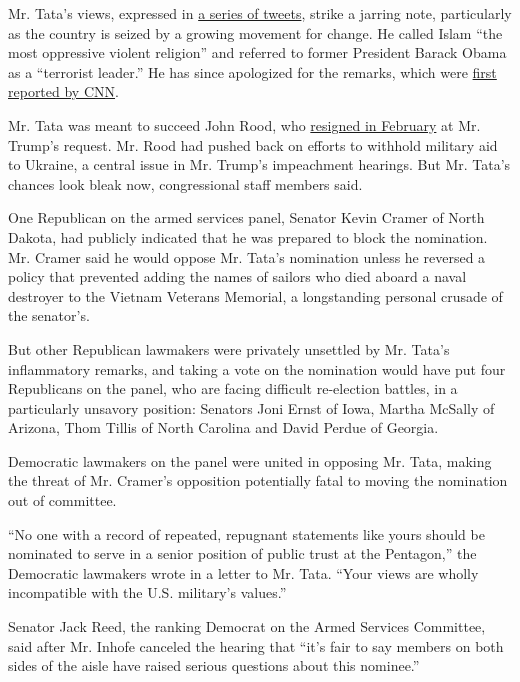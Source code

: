 Mr. Tata's views, expressed in
\href{https://twitter.com/ajtata/status/1014278134185840640}{a series of
tweets}, strike a jarring note, particularly as the country is seized by
a growing movement for change. He called Islam ``the most oppressive
violent religion'' and referred to former President Barack Obama as a
``terrorist leader.'' He has since apologized for the remarks, which
were
\href{https://edition.cnn.com/2020/06/12/politics/pentagon-nominee-tata-trump-kfile/index.html}{first
reported by CNN}.

Mr. Tata was meant to succeed John Rood, who
\href{https://www.nytimes3xbfgragh.onion/2020/02/19/us/politics/john-rood-trump.html}{resigned
in February} at Mr. Trump's request. Mr. Rood had pushed back on efforts
to withhold military aid to Ukraine, a central issue in Mr. Trump's
impeachment hearings. But Mr. Tata's chances look bleak now,
congressional staff members said.

One Republican on the armed services panel, Senator Kevin Cramer of
North Dakota, had publicly indicated that he was prepared to block the
nomination. Mr. Cramer said he would oppose Mr. Tata's nomination unless
he reversed a policy that prevented adding the names of sailors who died
aboard a naval destroyer to the Vietnam Veterans Memorial, a
longstanding personal crusade of the senator's.

But other Republican lawmakers were privately unsettled by Mr. Tata's
inflammatory remarks, and taking a vote on the nomination would have put
four Republicans on the panel, who are facing difficult re-election
battles, in a particularly unsavory position: Senators Joni Ernst of
Iowa, Martha McSally of Arizona, Thom Tillis of North Carolina and David
Perdue of Georgia.

Democratic lawmakers on the panel were united in opposing Mr. Tata,
making the threat of Mr. Cramer's opposition potentially fatal to moving
the nomination out of committee.

``No one with a record of repeated, repugnant statements like yours
should be nominated to serve in a senior position of public trust at the
Pentagon,'' the Democratic lawmakers wrote in a letter to Mr. Tata.
``Your views are wholly incompatible with the U.S. military's values.''

Senator Jack Reed, the ranking Democrat on the Armed Services Committee,
said after Mr. Inhofe canceled the hearing that ``it's fair to say
members on both sides of the aisle have raised serious questions about
this nominee.''

